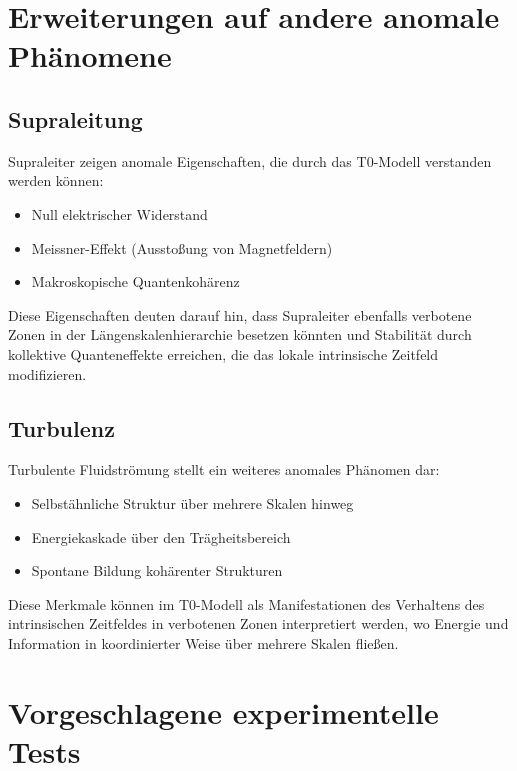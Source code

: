 \documentclass[12pt,a4paper]{article}
\begin{document}
	\section{Erweiterungen auf andere anomale Phänomene}
	\label{sec:extensions}
	
	\subsection{Supraleitung}
	\label{subsec:superconductivity}
	
	Supraleiter zeigen anomale Eigenschaften, die durch das T0-Modell verstanden werden können:
	
	\begin{itemize}
		\item Null elektrischer Widerstand
		\item Meissner-Effekt (Ausstoßung von Magnetfeldern)
		\item Makroskopische Quantenkohärenz
	\end{itemize}
	
	Diese Eigenschaften deuten darauf hin, dass Supraleiter ebenfalls verbotene Zonen in der Längenskalenhierarchie besetzen könnten und Stabilität durch kollektive Quanteneffekte erreichen, die das lokale intrinsische Zeitfeld modifizieren.
	
	\subsection{Turbulenz}
	\label{subsec:turbulence}
	
	Turbulente Fluidströmung stellt ein weiteres anomales Phänomen dar:
	
	\begin{itemize}
		\item Selbstähnliche Struktur über mehrere Skalen hinweg
		\item Energiekaskade über den Trägheitsbereich
		\item Spontane Bildung kohärenter Strukturen
	\end{itemize}
	
	Diese Merkmale können im T0-Modell als Manifestationen des Verhaltens des intrinsischen Zeitfeldes in verbotenen Zonen interpretiert werden, wo Energie und Information in koordinierter Weise über mehrere Skalen fließen.
	
	\section{Vorgeschlagene experimentelle Tests}
	\label{sec:experimental_tests}
	
\end{document}
